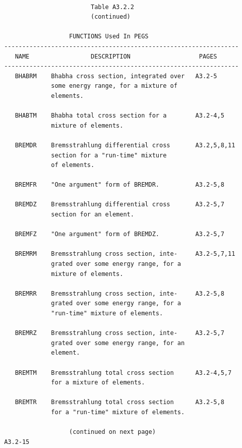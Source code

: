 \newpage  {}\begin{verbatim}
 
                         Table A3.2.2
                         (continued)
 
                   FUNCTIONS Used In PEGS
 -----------------------------------------------------------------
    NAME                 DESCRIPTION                   PAGES
 -----------------------------------------------------------------
    BHABRM    Bhabha cross section, integrated over   A3.2-5
              some energy range, for a mixture of
              elements.
 
    BHABTM    Bhabha total cross section for a        A3.2-4,5
              mixture of elements.
 
    BREMDR    Bremsstrahlung differential cross       A3.2,5,8,11
              section for a "run-time" mixture
              of elements.
 
    BREMFR    "One argument" form of BREMDR.          A3.2-5,8
 
    BREMDZ    Bremsstrahlung differential cross       A3.2-5,7
              section for an element.
 
    BREMFZ    "One argument" form of BREMDZ.          A3.2-5,7
 
    BREMRM    Bremsstrahlung cross section, inte-     A3.2-5,7,11
              grated over some energy range, for a
              mixture of elements.
 
    BREMRR    Bremsstrahlung cross section, inte-     A3.2-5,8
              grated over some energy range, for a
              "run-time" mixture of elements.
 
    BREMRZ    Bremsstrahlung cross section, inte-     A3.2-5,7
              grated over some energy range, for an
              element.
 
    BREMTM    Bremsstrahlung total cross section      A3.2-4,5,7
              for a mixture of elements.
 
    BREMTR    Bremsstrahlung total cross section      A3.2-5,8
              for a "run-time" mixture of elements.
 
                   (continued on next page)
 A3.2-15
\end{verbatim} 
